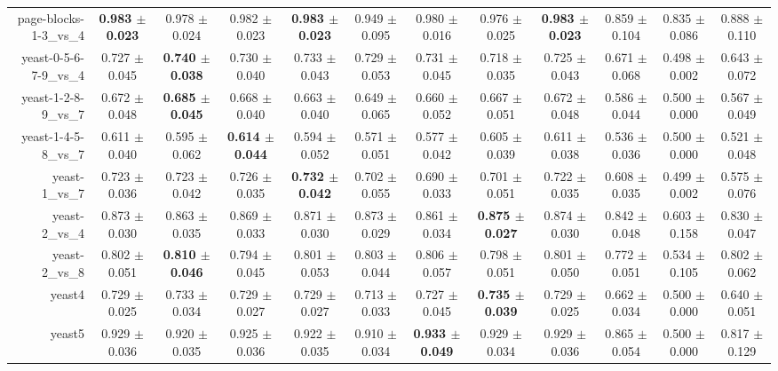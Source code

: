 \begin{table}[!ht]
{\begin{tabular}{r c c c c c c c c c c c}
page-blocks-1-3\_vs\_4 & \textbf{0.983 $\pm$ 0.023} & 0.978 $\pm$ 0.024 & 0.982 $\pm$ 0.023 & \textbf{0.983 $\pm$ 0.023} & 0.949 $\pm$ 0.095 & 0.980 $\pm$ 0.016 & 0.976 $\pm$ 0.025 & \textbf{0.983 $\pm$ 0.023} & 0.859 $\pm$ 0.104 & 0.835 $\pm$ 0.086 & 0.888 $\pm$ 0.110 \\
yeast-0-5-6-7-9\_vs\_4 & 0.727 $\pm$ 0.045 & \textbf{0.740 $\pm$ 0.038} & 0.730 $\pm$ 0.040 & 0.733 $\pm$ 0.043 & 0.729 $\pm$ 0.053 & 0.731 $\pm$ 0.045 & 0.718 $\pm$ 0.035 & 0.725 $\pm$ 0.043 & 0.671 $\pm$ 0.068 & 0.498 $\pm$ 0.002 & 0.643 $\pm$ 0.072 \\
yeast-1-2-8-9\_vs\_7 & 0.672 $\pm$ 0.048 & \textbf{0.685 $\pm$ 0.045} & 0.668 $\pm$ 0.040 & 0.663 $\pm$ 0.040 & 0.649 $\pm$ 0.065 & 0.660 $\pm$ 0.052 & 0.667 $\pm$ 0.051 & 0.672 $\pm$ 0.048 & 0.586 $\pm$ 0.044 & 0.500 $\pm$ 0.000 & 0.567 $\pm$ 0.049 \\
yeast-1-4-5-8\_vs\_7 & 0.611 $\pm$ 0.040 & 0.595 $\pm$ 0.062 & \textbf{0.614 $\pm$ 0.044} & 0.594 $\pm$ 0.052 & 0.571 $\pm$ 0.051 & 0.577 $\pm$ 0.042 & 0.605 $\pm$ 0.039 & 0.611 $\pm$ 0.038 & 0.536 $\pm$ 0.036 & 0.500 $\pm$ 0.000 & 0.521 $\pm$ 0.048 \\
yeast-1\_vs\_7 & 0.723 $\pm$ 0.036 & 0.723 $\pm$ 0.042 & 0.726 $\pm$ 0.035 & \textbf{0.732 $\pm$ 0.042} & 0.702 $\pm$ 0.055 & 0.690 $\pm$ 0.033 & 0.701 $\pm$ 0.051 & 0.722 $\pm$ 0.035 & 0.608 $\pm$ 0.035 & 0.499 $\pm$ 0.002 & 0.575 $\pm$ 0.076 \\
yeast-2\_vs\_4 & 0.873 $\pm$ 0.030 & 0.863 $\pm$ 0.035 & 0.869 $\pm$ 0.033 & 0.871 $\pm$ 0.030 & 0.873 $\pm$ 0.029 & 0.861 $\pm$ 0.034 & \textbf{0.875 $\pm$ 0.027} & 0.874 $\pm$ 0.030 & 0.842 $\pm$ 0.048 & 0.603 $\pm$ 0.158 & 0.830 $\pm$ 0.047 \\
yeast-2\_vs\_8 & 0.802 $\pm$ 0.051 & \textbf{0.810 $\pm$ 0.046} & 0.794 $\pm$ 0.045 & 0.801 $\pm$ 0.053 & 0.803 $\pm$ 0.044 & 0.806 $\pm$ 0.057 & 0.798 $\pm$ 0.051 & 0.801 $\pm$ 0.050 & 0.772 $\pm$ 0.051 & 0.534 $\pm$ 0.105 & 0.802 $\pm$ 0.062 \\
yeast4 & 0.729 $\pm$ 0.025 & 0.733 $\pm$ 0.034 & 0.729 $\pm$ 0.027 & 0.729 $\pm$ 0.027 & 0.713 $\pm$ 0.033 & 0.727 $\pm$ 0.045 & \textbf{0.735 $\pm$ 0.039} & 0.729 $\pm$ 0.025 & 0.662 $\pm$ 0.034 & 0.500 $\pm$ 0.000 & 0.640 $\pm$ 0.051 \\
yeast5 & 0.929 $\pm$ 0.036 & 0.920 $\pm$ 0.035 & 0.925 $\pm$ 0.036 & 0.922 $\pm$ 0.035 & 0.910 $\pm$ 0.034 & \textbf{0.933 $\pm$ 0.049} & 0.929 $\pm$ 0.034 & 0.929 $\pm$ 0.036 & 0.865 $\pm$ 0.054 & 0.500 $\pm$ 0.000 & 0.817 $\pm$ 0.129 \\

\end{tabular}}
\end{table}
